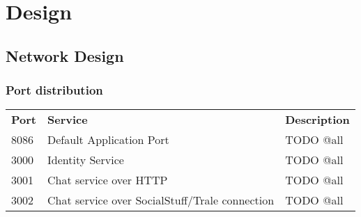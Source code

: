 

\chapter{Design}\label{ch:design}


\section{Network Design}\label{sec:network-design}

\subsection{Port distribution}\label{subsec:port-distribution}

\begin{table}[]
    \begin{tabular}{lll}
        \textbf{Port} & \textbf{Service}                               & \textbf{Description} \\
        8086          & Default Application Port                       & TODO @all            \\
        3000          & Identity Service                               & TODO @all            \\
        3001          & Chat service over HTTP                         & TODO @all            \\
        3002          & Chat service over SocialStuff/Trale connection & TODO @all
    \end{tabular}\label{tab:table}
\end{table}

\lipsum[2-4]
